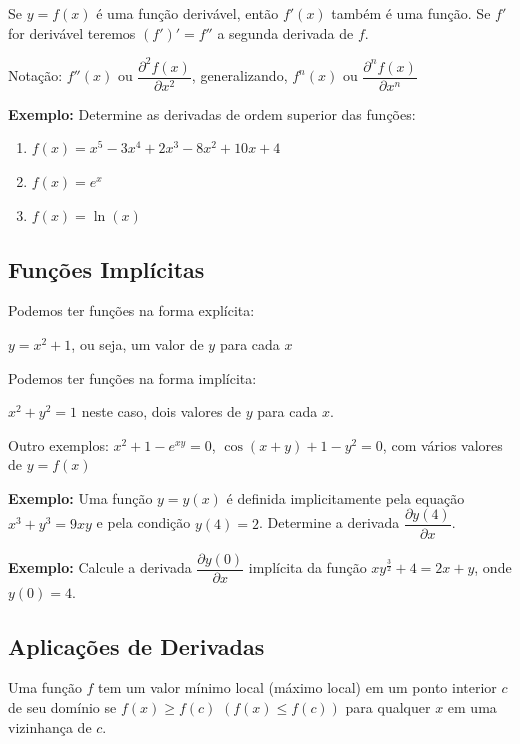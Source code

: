 \documentclass[oneside,a4paper,12pt]{article}
\begin{document}
Se $y = f(x)$ é uma função derivável, então $f'(x)$ também é uma função. Se $f'$ for derivável teremos $(f')' = f''$ a segunda derivada de $f$.

Notação: $f''(x)$ ou $\dfrac{\partial ^2 f(x)}{\partial x^2}$, generalizando, $f^{n}(x)$ ou $\dfrac{\partial ^{n}f(x)}{\partial x^{n}}$

{\bf Exemplo:} Determine as derivadas de ordem superior das funções:
\begin{enumerate}
	\item $f(x) = x^5 - 3x^4 + 2x^3 - 8x^2 + 10x + 4$
	\item $f(x) = e^x$
	\item $f(x) = \ln(x)$
\end{enumerate}
\newpage

\subsection{Funções Implícitas}

Podemos ter funções na forma explícita:

$y = x^2 + 1$, ou seja, um valor de $y$ para cada $x$

Podemos ter funções na forma implícita:

$x^2 + y^2 = 1$ neste caso, dois valores de $y$ para cada $x$.

Outro exemplos: $x^2 + 1 - e^{xy} = 0$, $\cos(x+y) + 1 - y^2 = 0$, com vários valores de $y = f(x)$

{\bf Exemplo: } Uma função $y = y(x)$ é definida implicitamente pela equação $x^3 + y^3 = 9xy$ e pela condição $y(4) = 2$. Determine a derivada $\dfrac{\partial y(4)}{\partial x}$.

\newpage

{\bf Exemplo: } Calcule a derivada $\dfrac{\partial y(0)}{\partial x}$ implícita da função $xy^{\frac{3}{2}} + 4 = 2x + y$, onde $y(0) = 4$.

\newpage

\subsection{Aplicações de Derivadas}

Uma função $f$ tem um valor mínimo local (máximo local) em um ponto interior $c$ de seu domínio se $f(x) \geq f(c)$ $(f(x) \leq f(c))$ para qualquer $x$ em uma vizinhança de $c$.

\vspace{200pt}
\end{document}
